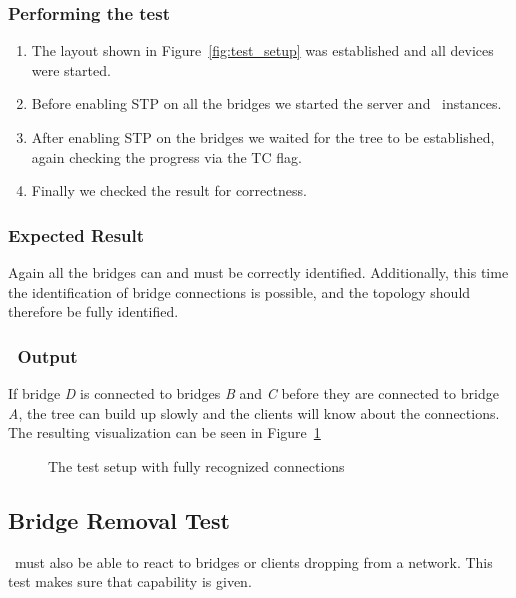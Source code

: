 \subsubsection*{Performing the test}
\begin{enumerate}
    \item The layout shown in Figure~\ref{fig:test_setup} was established and all devices were started.
    \item Before enabling STP on all the bridges we started the server and \tool\ instances.
    \item After enabling STP on the bridges we waited for the tree to be established, again checking the progress via the TC flag.
    \item Finally we checked the result for correctness.
\end{enumerate}

\subsubsection*{Expected Result}
Again all the bridges can and must be correctly identified.
Additionally, this time the identification of bridge connections is possible, and the topology should therefore be fully identified.

\subsubsection*{\tool\ Output}
If bridge \textit{D} is connected to bridges \textit{B} and \textit{C} before they are connected to bridge \textit{A}, the tree can build up slowly and the clients will know about the connections.
The resulting visualization can be seen in Figure~\ref{fig:est}
\begin{figure}[h]
    \centering
    \caption{The test setup with fully recognized connections}
    \label{fig:est}
\end{figure}

\subsection*{Bridge Removal Test}
\label{removal_test}
\tool\ must also be able to react to bridges or clients dropping from a network.
This test makes sure that capability is given.

